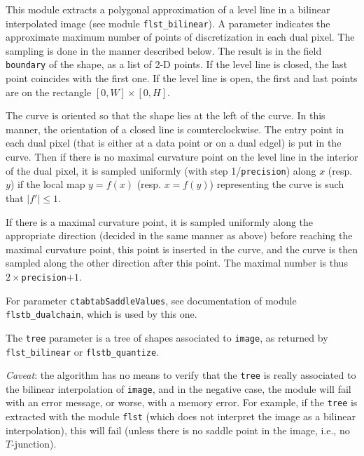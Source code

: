 This module extracts a polygonal approximation of a level line 
 in a bilinear
interpolated image (see module \texttt{flst\_bilinear}). 
A parameter indicates
the approximate maximum number of points of discretization in each dual
pixel. The sampling is done in the manner described below. The result is in
the field \texttt{boundary} of the shape, as a list of 2-D points. If the
level line is closed, the last point coincides with the first one. If the
level line is open, the first and last points are on the rectangle
$[0,W]\times [0,H]$.

The curve is oriented so that the shape lies at the left of the curve. In this
manner, the orientation of a closed line is counterclockwise. The entry point
in each dual pixel (that is either at a data point or on a dual edgel) is put
in the curve. Then if there is no maximal curvature point on the level line in
the interior of the dual pixel, it is sampled uniformly (with step
1/\texttt{precision}) along $x$ (resp. $y$) if
the local map $y=f(x)$ (resp. $x=f(y)$) representing the curve is such that
$|f'|\leq 1$.

If there is a maximal curvature point, it is sampled uniformly along the
appropriate direction (decided in the same manner as above) before reaching
the maximal curvature point, this point is inserted in the curve, and the
curve is then sampled along the other direction after this point.
The maximal number is thus $2\times$\texttt{precision}$+1$.

For parameter \texttt{ctabtabSaddleValues}, see documentation of module
\texttt{flstb\_dualchain}, which is used by this one.

The \texttt{tree} parameter is a tree of shapes associated to \texttt{image},
as returned by \texttt{flst\_bilinear} or \texttt{flstb\_quantize}. 

{\em Caveat}: the algorithm has no means to verify that the \texttt{tree} is
really associated to the bilinear interpolation of \texttt{image}, and in the
negative case, the module will fail with an error message, or worse, with a
memory error. For example, if the \texttt{tree} is extracted with the module
\texttt{flst}
(which does not interpret the image as a bilinear
interpolation), this will fail (unless there is no saddle point in the
image, i.e., no $T$-junction).
